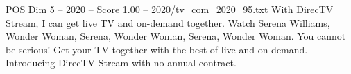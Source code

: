 \begin{textsample}{POS Dim 5 – 2020 – Score 1.00 – 2020/tv\_com\_2020\_95.txt}  \label{ex:f5_pos_037}
With DirecTV Stream, I can get live TV and on-demand together.
Watch Serena Williams, Wonder Woman, Serena, Wonder Woman, Serena, Wonder Woman.
You cannot be serious!
Get your TV together with the best of live and on-demand.
Introducing DirecTV Stream with no annual contract.

\end{textsample}
